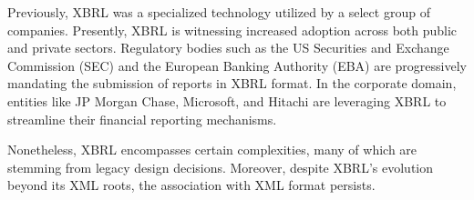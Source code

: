 Previously, XBRL was a specialized technology utilized by a select group of companies.
Presently, XBRL is witnessing increased adoption across both public and private sectors.
Regulatory bodies such as the US Securities and Exchange Commission (SEC)\cite{sec_ixbrl} and the European Banking Authority (EBA)\cite{eba_reporting_frameworks} are progressively mandating the submission of reports in XBRL format.
In the corporate domain, entities like JP Morgan Chase, Microsoft, and Hitachi are leveraging XBRL to streamline their financial reporting mechanisms.\cite{pwc2002thejournal}

Nonetheless, XBRL encompasses certain complexities,
many of which are stemming from legacy design decisions.
Moreover, despite XBRL's evolution beyond its XML roots,
the association with XML format persists.

